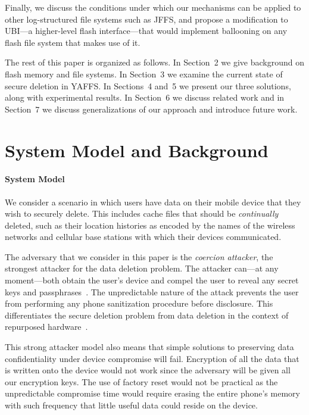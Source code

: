 \documentclass{acmtog}
\begin{document}
Finally, we discuss the conditions under which our mechanisms can be applied to other log-structured 
file systems such as JFFS, and propose a modification to UBI---a 
higher-level flash interface---that would implement ballooning on any flash
file system that makes use of it.


The rest of this paper is organized as follows. In Section~2 we give background
on flash memory and file systems. In Section~3 we examine the current state
of secure deletion in YAFFS. In Sections~4 and~5 we present our three solutions,
along with experimental results.
In Section~6 we discuss related work and in Section~7 we discuss
generalizations of our approach and introduce future work.

\newpage

\section{System Model and Background}

\paragraph{System Model}
We consider a scenario in which users have
data on their mobile device that they wish to securely delete. This includes
cache files that should be \emph{continually} deleted, such as their location
histories as encoded by the names 
of the wireless networks and cellular base stations with which  their devices
communicated.


The adversary that we consider in this paper is the \emph{coercion attacker}, the
strongest attacker for the data deletion problem. The attacker can---at any
moment---both obtain the user's device and compel the user to reveal any secret
keys and passphrases~\cite{porter}.  The unpredictable nature of the attack 
prevents the user from performing any phone sanitization procedure
before disclosure. This differentiates the secure deletion problem from data deletion in the
context of repurposed hardware~\cite{survey}.

This strong attacker model also means that simple solutions to preserving data
confidentiality under device compromise will fail. Encryption of all the data
that is written onto the device would not work 
since the adversary will
be given all our encryption keys.
The use of factory reset would not be practical
as the unpredictable compromise time would require erasing
the entire phone's memory with such
frequency that little useful data could reside on the device.
\end{document}
